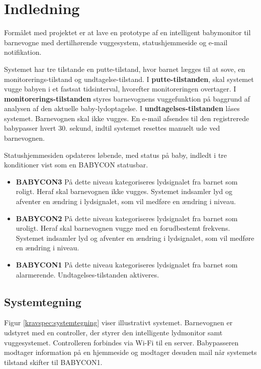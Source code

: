\section{Indledning}

Formålet med projektet er at lave en prototype af en intelligent babymonitor til barnevogne med dertilhørende vuggesystem, statushjemmeside og e-mail notifikation.

Systemet har tre tilstande en putte-tilstand, hvor barnet lægges til at sove, en monitorerings-tilstand og undtagelse-tilstand.
I \textbf{putte-tilstanden}, skal systemet vugge babyen i et fastsat tidsinterval, hvorefter monitoreringen overtager.
I \textbf{monitorerings-tilstanden} styres barnevognens vuggefunktion på baggrund af analysen af den aktuelle baby-lydoptagelse.
I \textbf{undtagelses-tilstanden} låses systemet. Barnevognen skal ikke vugges. En e-mail afsendes til den registrerede babypasser hvert 30. sekund, indtil systemet resettes manuelt ude ved barnevognen. 

Statushjemmesiden opdateres løbende, med status på baby, indledt i tre konditioner vist som en BABYCON statusbar.

\begin{itemize}
\item \textbf{BABYCON3} 
\newline På dette niveau kategoriseres lydsignalet fra barnet som roligt. Heraf skal barnevognen ikke vugges. Systemet indsamler lyd og afventer en ændring i lydsignalet, som vil medføre en ændring i niveau. 

\item \textbf{BABYCON2}
\newline På dette niveau kategoriseres lydsignalet fra barnet som uroligt. Heraf skal barnevognen vugge med en forudbestemt frekvens. Systemet indsamler lyd og afventer en ændring i lydsignalet, som vil medføre en ændring i niveau. 

\item \textbf{BABYCON1}
\newline På dette niveau kategoriseres lydsignalet fra barnet som alarmerende. Undtagelses-tilstanden aktiveres. 
\end{itemize}
 
\subsection*{Systemtegning}

Figur \ref{kravspec:systemtegning} viser illustrativt systemet. Barnevognen er udstyret med en controller, der styrer den intelligente lydmonitor samt vuggesystemet. Controlleren forbindes via Wi-Fi til en server. Babypasseren modtager information på en hjemmeside og modtager desuden mail når systemets tilstand skifter til BABYCON1.